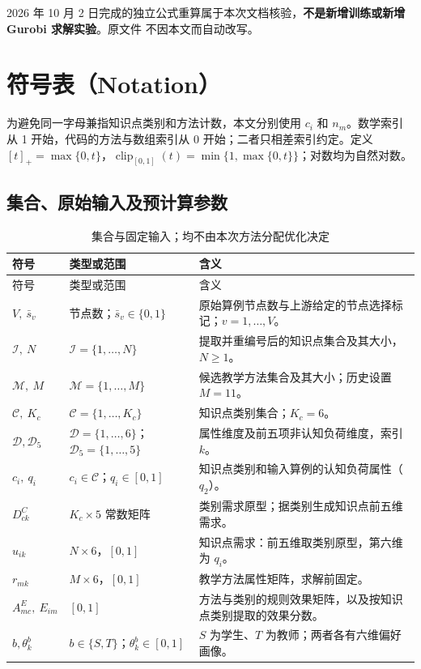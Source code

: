 \documentclass[UTF8,11pt,a4paper,fontset=fandol]{ctexart}
\newcommand{\clip}{\operatorname{clip}_{[0,1]}}
\newcommand{\I}{\mathcal I}
\newcommand{\M}{\mathcal M}
\begin{document}
2026 年 10 月 2 日完成的独立公式重算属于本次文档核验，\textbf{不是新增训练或新增 Gurobi 求解实验}。原文件  不因本文而自动改写。

\section{符号表（Notation）}
为避免同一字母兼指知识点类别和方法计数，本文分别使用 $c_i$ 和 $n_m$。数学索引从 1 开始，代码的方法与数组索引从 0 开始；二者只相差索引约定。定义 $[t]_+=\max\{0,t\}$，$\clip(t)=\min\{1,\max\{0,t\}\}$；对数均为自然对数。

\subsection{集合、原始输入及预计算参数}
\small
\begin{longtable}{p{}p{}p{}}
\caption{集合与固定输入；均不由本次方法分配优化决定}\label{tab:inputs}\\
\toprule 符号 & 类型或范围 & 含义 \\ \midrule\endfirsthead
\toprule 符号 & 类型或范围 & 含义 \\ \midrule\endhead
\bottomrule\endfoot
$V,\ \bar s_v$ & 节点数；$\bar s_v\in\{0,1\}$ & 原始算例节点数与上游给定的节点选择标记；$v=1,\ldots,V$。\\
$\I,\ N$ & $\I=\{1,\ldots,N\}$ & 提取并重编号后的知识点集合及其大小，$N\ge1$。\\
$\M,\ M$ & $\M=\{1,\ldots,M\}$ & 候选教学方法集合及其大小；历史设置 $M=11$。\\
$\mathcal C,\ K_c$ & $\mathcal C=\{1,\ldots,K_c\}$ & 知识点类别集合；$K_c=6$。\\
$\mathcal D,\mathcal D_5$ & $\mathcal D=\{1,\ldots,6\}$；$\mathcal D_5=\{1,\ldots,5\}$ & 属性维度及前五项非认知负荷维度，索引 $k$。\\
$c_i,\ q_i$ & $c_i\in\mathcal C$；$q_i\in[0,1]$ & 知识点类别和输入算例的认知负荷属性（$q_2$）。\\
$D^C_{ck}$ & $K_c\times5$ 常数矩阵 & 类别需求原型；据类别生成知识点前五维需求。\\
$u_{ik}$ & $N\times6$，$[0,1]$ & 知识点需求：前五维取类别原型，第六维为 $q_i$。\\
$r_{mk}$ & $M\times6$，$[0,1]$ & 教学方法属性矩阵，求解前固定。\\
$A^E_{mc},\ E_{im}$ & $[0,1]$ & 方法与类别的规则效果矩阵，以及按知识点类别提取的效果分数。\\
$b,\theta^b_k$ & $b\in\{S,T\}$；$\theta^b_k\in[0,1]$ & $S$ 为学生、$T$ 为教师；两者各有六维偏好画像。\\

\end{longtable}
\end{document}

